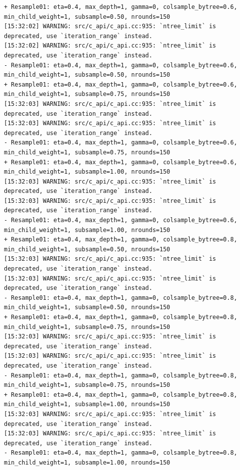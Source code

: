 \documentclass[
  letterpaper,
  DIV=11,
  numbers=noendperiod]{scrartcl}
\begin{document}
\begin{verbatim}
+ Resample01: eta=0.4, max_depth=1, gamma=0, colsample_bytree=0.6, min_child_weight=1, subsample=0.50, nrounds=150 
[15:32:02] WARNING: src/c_api/c_api.cc:935: `ntree_limit` is deprecated, use `iteration_range` instead.
[15:32:02] WARNING: src/c_api/c_api.cc:935: `ntree_limit` is deprecated, use `iteration_range` instead.
- Resample01: eta=0.4, max_depth=1, gamma=0, colsample_bytree=0.6, min_child_weight=1, subsample=0.50, nrounds=150 
+ Resample01: eta=0.4, max_depth=1, gamma=0, colsample_bytree=0.6, min_child_weight=1, subsample=0.75, nrounds=150 
[15:32:03] WARNING: src/c_api/c_api.cc:935: `ntree_limit` is deprecated, use `iteration_range` instead.
[15:32:03] WARNING: src/c_api/c_api.cc:935: `ntree_limit` is deprecated, use `iteration_range` instead.
- Resample01: eta=0.4, max_depth=1, gamma=0, colsample_bytree=0.6, min_child_weight=1, subsample=0.75, nrounds=150 
+ Resample01: eta=0.4, max_depth=1, gamma=0, colsample_bytree=0.6, min_child_weight=1, subsample=1.00, nrounds=150 
[15:32:03] WARNING: src/c_api/c_api.cc:935: `ntree_limit` is deprecated, use `iteration_range` instead.
[15:32:03] WARNING: src/c_api/c_api.cc:935: `ntree_limit` is deprecated, use `iteration_range` instead.
- Resample01: eta=0.4, max_depth=1, gamma=0, colsample_bytree=0.6, min_child_weight=1, subsample=1.00, nrounds=150 
+ Resample01: eta=0.4, max_depth=1, gamma=0, colsample_bytree=0.8, min_child_weight=1, subsample=0.50, nrounds=150 
[15:32:03] WARNING: src/c_api/c_api.cc:935: `ntree_limit` is deprecated, use `iteration_range` instead.
[15:32:03] WARNING: src/c_api/c_api.cc:935: `ntree_limit` is deprecated, use `iteration_range` instead.
- Resample01: eta=0.4, max_depth=1, gamma=0, colsample_bytree=0.8, min_child_weight=1, subsample=0.50, nrounds=150 
+ Resample01: eta=0.4, max_depth=1, gamma=0, colsample_bytree=0.8, min_child_weight=1, subsample=0.75, nrounds=150 
[15:32:03] WARNING: src/c_api/c_api.cc:935: `ntree_limit` is deprecated, use `iteration_range` instead.
[15:32:03] WARNING: src/c_api/c_api.cc:935: `ntree_limit` is deprecated, use `iteration_range` instead.
- Resample01: eta=0.4, max_depth=1, gamma=0, colsample_bytree=0.8, min_child_weight=1, subsample=0.75, nrounds=150 
+ Resample01: eta=0.4, max_depth=1, gamma=0, colsample_bytree=0.8, min_child_weight=1, subsample=1.00, nrounds=150 
[15:32:03] WARNING: src/c_api/c_api.cc:935: `ntree_limit` is deprecated, use `iteration_range` instead.
[15:32:03] WARNING: src/c_api/c_api.cc:935: `ntree_limit` is deprecated, use `iteration_range` instead.
- Resample01: eta=0.4, max_depth=1, gamma=0, colsample_bytree=0.8, min_child_weight=1, subsample=1.00, nrounds=150 

\end{verbatim}
\end{document}
